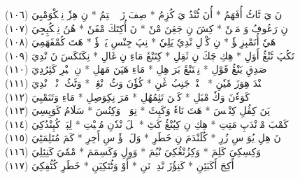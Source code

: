 \documentclass[a4paper, 10pt]{report}
\begin{document}
\begin{center}
\textarabic{(١٠٦) \textcolor{mygreen}{نَ يَ ٹَاٹُ أُفَهَمُ  * أُنَ ٹُنْدُ يَ كُزِمُ  * صِفَ زَكٖ زٖمٖتِمُ  * نِ هِزٗ نِمٖكْوَمْبِيَ }} 
\\[5mm] 

\textarabic{(١٠٧) \textcolor{mygreen}{نِ رَعُوفُ وَ مَنٖنٗ  * كِشَ نِ جَڠِنَ مْنٗ  * نَ أُكِتَكَ مْفَنٗ  * هُنُ نِمٖكُپِجِيَ }} 
\\[5mm] 

\textarabic{(١٠٨) \textcolor{mygreen}{هَيٗ أُنَمْبِزِيٖؤٗ  * نِ كْوٖلِ نْدِيٗ يَلِيٗ  * نِپَ جِنْسِ يَوٖءٖؤٗ  * هَتَ كُمْفَهَمِيَ }} 
\\[5mm] 

\textarabic{(١٠٩) \textcolor{mygreen}{تَكُپَ ٹَنْڠُ أَوَلِ  * هِكِ چَكَ نِ ثَقِلِ  * كِتَنْڠَ مَاءِ نِ غَالِ  * نِكَتَكَسَ نَ نْدِيَ }} 
\\[5mm] 

\textarabic{(١١٠) \textcolor{mygreen}{صَدِقِ يَنْڠُ قَوْلِ  * نِمٖتَنْڠَ بَرَ هِلِ  * مَاءِ هَپَنَ مَهَلِ  * نِ خٖيْرِ كَئِرُدِيَ }} 
\\[5mm] 

\textarabic{(١١١) \textcolor{mygreen}{هٖنْدَ هِوَزَ مٗيٗنِ  * نٖنٖنْدٖ جَنِبُ ڠَنِ  * كُؤٗنَ وَٹُ وٖنْڠِنٖ  * وَٹَٹُ وٖنْدٖمٖ نْدِيَ }} 
\\[5mm] 

\textarabic{(١١٢) \textcolor{mygreen}{كَوَءٗنَ وَكٗ مْبَلِ  * كَنٖنَ تَئِمُهُلِ  * مَرَ نِكِوَصِلِ  * مَاءِ وَتَنَمْبِيَ }} 
\\[5mm] 

\textarabic{(١١٣) \textcolor{mygreen}{پَنَ كِڤُلِ كِنْيٖسَ  * هَتَ نَاءٗ وَكَپِٹَ  * نِوَوٖنٖ وَكِنُسَ  * سَلَامُ كَوَپِسِيَ }} 
\\[5mm] 

\textarabic{(١١٤) \textcolor{mygreen}{كَمْبَ مْوٖنْدَپِ مَتِتِ  * هِكِ نِ كِپُنْڠُ كَٹِ  * هٖلَ نْدٗنِ مُكٖيْتِ  * لِپَٹٖ كُپِنْدُكِيَ }} 
\\[5mm] 

\textarabic{(١١٥) \textcolor{mygreen}{نَ هِلِ يُوَ سِ زُرِ  * كُلَنْدَمَ نِ خَطَرِ  * وَلَ زٖؤٗ سِ أَخِرِ  * كَمَ مُتَلِمَٹِيَ }} 
\\[5mm] 

\textarabic{(١١٦) \textcolor{mygreen}{وَكِسِكِيَ كَلِمَ  * وَكِزُنْڠُكِيَ نْيُمَ  * وَوِلِ وَكَسِمَمَ  * مْمٗيَ كَنِئِلِيَ }} 
\\[5mm] 

\textarabic{(١١٧) \textcolor{mygreen}{أَكِجَ أَكَبَئِنِ  * كَنِؤُزَ نْدِوٖ نَنِ  * أَوْ وَٹُتَكِيَنِ  * خَطَرِ كُٹُفِكِيَ }} 
\\[5mm] 


\end{center}
\end{document}
